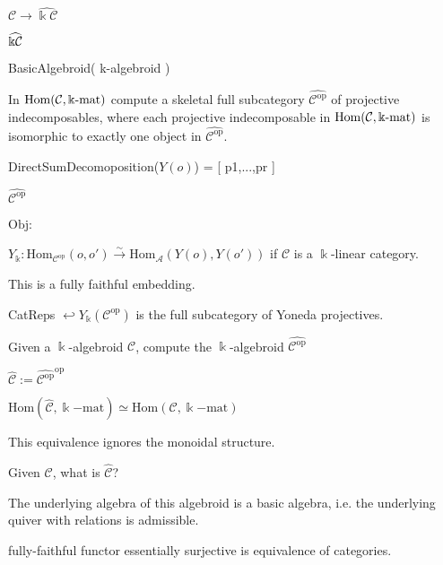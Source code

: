 
$\mathcal{C} \rightarrow \widehat{\Bbbk\mathcal{C}}$

$\widehat{\Bbbk\mathcal{C}}$

BasicAlgebroid( k-algebroid )

In $\mathrm{Hom}(\mathcal{C},\Bbbk\textnormal{-}\mathrm{mat})$ compute a skeletal full subcategory
$\widehat{\mathcal{C}^{\mathrm{op}}}$ of projective indecomposables,
where each projective indecomposable in $\mathrm{Hom}(\mathcal{C},\Bbbk\textnormal{-}\mathrm{mat})$ is isomorphic to exactly one
object in $\widehat{\mathcal{C}^{\mathrm{op}}}$.

DirectSumDecomoposition($Y(o)$) = [ p1,...,pr ]

$\widehat{\mathcal{C}^{\mathrm{op}}}$

$\mathrm{Obj}$: 

$Y_{\Bbbk} : \mathrm{Hom}_{\mathcal{C}^{\mathrm{op}}}(o,o') \xrightarrow{\sim} \mathrm{Hom}_\mathcal{A} (Y(o),Y(o'))$ if $\mathcal{C}$ is a $\Bbbk$-linear category.

This is a fully faithful embedding.

CatReps $\hookleftarrow Y_{\Bbbk}(\mathcal{C}^{\mathrm{op}})$ is the full subcategory of Yoneda projectives.

Given a $\Bbbk$-algebroid $\mathcal{C}$, compute the $\Bbbk$-algebroid $\widehat{\mathcal{C}^{\mathrm{op}}}$ 

$\widehat{\mathcal{C}} := \widehat{\mathcal{C}^{\mathrm{op}}}^{\mathrm{op}}$

$\mathrm{Hom}(\widehat{\mathcal{C}},\Bbbk\mathrm{-mat}) \simeq \mathrm{Hom}(\mathcal{C},\Bbbk\mathrm{-mat})$

This equivalence ignores the monoidal structure.

Given $\mathcal{C}$, what is $\widehat{\mathcal{C}}$?

The underlying algebra of this algebroid is a basic algebra, i.e. the underlying quiver with relations is admissible.

fully-faithful functor essentially surjective is equivalence of categories.